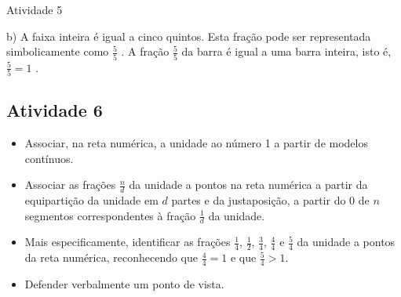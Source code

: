 \documentclass[oneside]{book}
\begin{document}
\begin{multicols}{2}
\begin{resposta*}{Atividade 5}
\begin{center}
\end{center}

\noindent b)   A faixa inteira é igual a cinco quintos. Esta fração pode ser representada simbolicamente como     $\frac{5}{5}$    . A fração     $\frac{5}{5}$     da barra é igual a uma barra inteira, isto é,     $\frac{5}{5}=1$    . 

\end{resposta*}



\subsection{Atividade 6}

\begin{itemize} %
    \item       Associar, na reta numérica, a unidade ao número 1 a partir de modelos contínuos.
    \item       Associar as frações       $\frac{n}{d}$       da unidade a pontos na reta numérica a partir da equipartição da unidade em       $d$       partes e da justaposição, a partir do       $0$       de       $n$       segmentos correspondentes à fração       $\frac{1}{d}$       da unidade. 
    \item       Mais especificamente, identificar as frações       $\frac{1}{4}$,       $\frac{1}{2}$,       $\frac{3}{4}$,       $\frac{4}{4}$       e       $\frac{5}{4}$       da unidade a pontos da reta numérica, reconhecendo que       $\frac{4}{4}=1$       e que       $\frac{5}{4}>1$.
    \item       Defender verbalmente um ponto de vista.
\end{itemize} %
  

\end{multicols}
\end{document}
